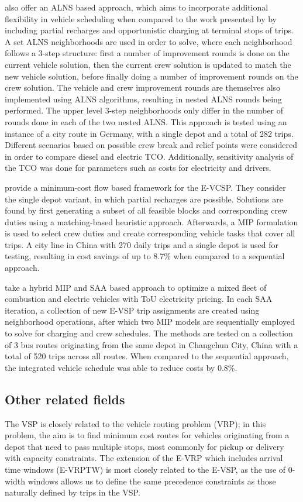 \documentclass[]{article}
\begin{document}
\citet{Sistig2023} also offer an ALNS based approach, which aims to incorporate additional flexibility in vehicle scheduling when compared to the work presented by \citet{Perumal2021} by including partial recharges and opportunistic charging at terminal stops of trips. A set ALNS neighborhoods are used in order to solve, where each neighborhood follows a 3-step structure: first a number of improvement rounds is done on the current vehicle solution, then the current crew solution is updated to match the new vehicle solution, before finally doing a number of improvement rounds on the crew solution. The vehicle and crew improvement rounds are themselves also implemented using ALNS algorithms, resulting in nested ALNS rounds being performed. The upper level 3-step neighborhoods only differ in the number of rounds done in each of the two nested ALNS. This approach is tested using an instance of a city route in Germany, with a single depot and a total of 282 trips. Different scenarios based on possible crew break and relief points were considered in order to compare diesel and electric TCO. Additionally, sensitivity analysis of the TCO was done for parameters such as costs for electricity and drivers.

\citet{Shen2023} provide a minimum-cost flow based framework for the E-VCSP. They consider the single depot variant, in which partial recharges are possible. Solutions are found by first generating a subset of all feasible blocks and corresponding crew duties using a matching-based heuristic approach. Afterwards, a MIP formulation is used to select crew duties and create corresponding vehicle tasks that cover all trips. A city line in China with 270 daily trips and a single depot is used for testing, resulting in cost savings of up to 8.7\% when compared to a sequential approach.

\citet{Cong2024} take a hybrid MIP and SAA based approach to optimize a mixed fleet of combustion and electric vehicles with ToU electricity pricing. In each SAA iteration, a collection of new E-VSP trip assignments are created using neighborhood operations, after which two MIP models are sequentially employed to solve for charging and crew schedules. The methods are tested on a collection of 3 bus routes originating from the same depot in Changchun City, China with a total of 520 trips across all routes. When compared to the sequential approach, the integrated vehicle schedule was able to reduce costs by 0.8\%. 

\subsection{Other related fields}
The VSP is closely related to the vehicle routing problem (VRP); in this problem, the aim is to find minimum cost routes for vehicles originating from a depot that need to pass multiple stops, most commonly for pickup or delivery with capacity constraints. The extension of the E-VRP which includes arrival time windows (E-VRPTW) is most closely related to the E-VSP, as the use of 0-width windows allows us to define the same precedence constraints as those naturally defined by trips in the VSP.
\end{document}
